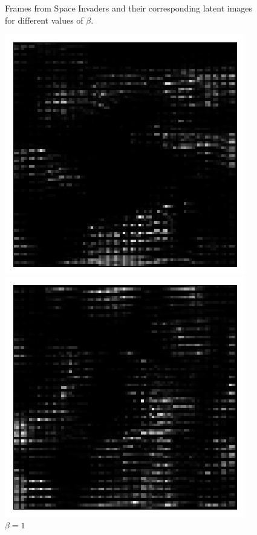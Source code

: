 \begin{figure}[h!]
\begin{multicols}{4}
    \caption{$\beta=4$}
\end{multicols}
\caption{Frames from Space Invaders and their corresponding latent images for different values of $\beta$.}
\label{fig:latent_image_originals_and_latent_spaces}
\end{figure}


\begin{figure}[h!]
\centering
\captionsetup{justification=centering}
\begin{multicols}{3}
    \includegraphics[scale=0.4]{figures/results/latent_image/beta_1_prior_sample_1.png}
    \caption{$\beta=1$}
    \includegraphics[scale=0.4]{figures/results/latent_image/beta_2_prior_sample_2.png}

\end{multicols}
\end{figure}
